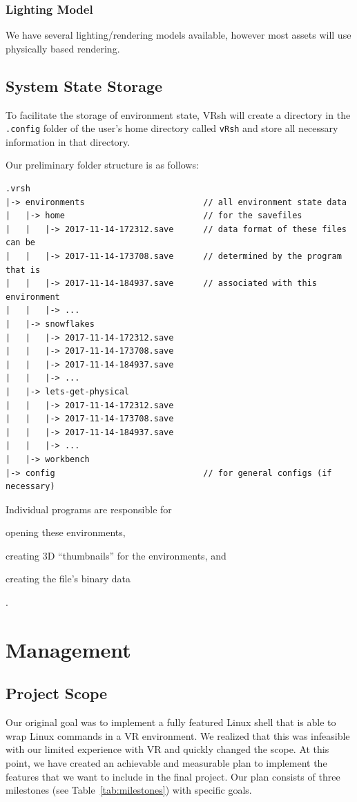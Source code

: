\documentclass[titlepage,12pt]{article}
\newcommand\name{VRsh}
\begin{document}
\subsubsection{Lighting Model} We have several lighting/rendering models
available, however most assets will use physically based rendering.

\subsection{System State Storage}\label{sec:state}
To facilitate the storage of environment state, {\name} will create a directory
in the \texttt{.config} folder of the user's home directory called
\texttt{\MakeLowercase\name} and store all necessary information in that
directory.

\newpage
Our preliminary folder structure is as follows:
\begin{verbatim}
.vrsh
|-> environments                        // all environment state data
|   |-> home                            // for the savefiles
|   |   |-> 2017-11-14-172312.save      // data format of these files can be
|   |   |-> 2017-11-14-173708.save      // determined by the program that is
|   |   |-> 2017-11-14-184937.save      // associated with this environment
|   |   |-> ...
|   |-> snowflakes
|   |   |-> 2017-11-14-172312.save
|   |   |-> 2017-11-14-173708.save
|   |   |-> 2017-11-14-184937.save
|   |   |-> ...
|   |-> lets-get-physical
|   |   |-> 2017-11-14-172312.save
|   |   |-> 2017-11-14-173708.save
|   |   |-> 2017-11-14-184937.save
|   |   |-> ...
|   |-> workbench
|-> config                              // for general configs (if necessary)
\end{verbatim}

Individual programs are responsible for
\begin{enumerate*}[label={(\alph*)}]
\item opening these environments,
\item creating 3D ``thumbnails'' for the environments, and
\item creating the file's binary data
\end{enumerate*}.

\section{Management}

\subsection{Project Scope}
Our original goal was to implement a fully featured Linux shell that is able to
wrap Linux commands in a VR environment. We realized that this was infeasible
with our limited experience with VR and quickly changed the scope. At this
point, we have created an achievable and measurable plan to implement the
features that we want to include in the final project. Our plan consists of
three milestones (see Table~\ref{tab:milestones}) with specific goals.
\end{document}
